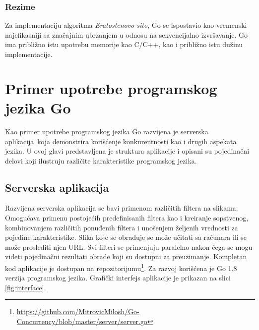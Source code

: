 \documentclass[12pt,oneside]{memoir}
\begin{document}
\subsection{Rezime}

Za implementaciju algoritma \textit{Eratostenovo sito}, Go se ispostavio kao vremenski najefikasniji sa značajnim ubrzanjem u odnosu na sekvencijalno izvršavanje. Go ima približno istu upotrebu memorije kao C/C++, kao i približno istu dužinu implementacije.


\chapter{Primer upotrebe programskog jezika Go}\label{app}

Kao primer upotrebe programskog jezika Go razvijena je serverska aplikacija\ koja demonstrira korišćenje konkurentnosti kao i drugih aspekata jezika. U ovoj glavi predstavljena je struktura aplikacije i opisani su pojedinačni delovi koji ilustruju različite karakteristike programskog jezika. 

\section{Serverska aplikacija}

Razvijena serverska aplikacija se bavi primenom različitih filtera na slikama. Omogućava primenu postojećih predefinisanih filtera kao i kreiranje sopstvenog, kombinovanjem različitih ponuđenih filtera i unošenjem željenih vrednosti za pojedine karakteristike. Slika koje se obrađuje se može učitati sa računara ili se može proslediti njen URL. Svi filteri se primenjuju paralelno nakon čega se mogu videti pojedinačni rezultati obrade koji su dostupni za preuzimanje. Kompletan kod aplikacije je dostupan na repozitorijumu\footnote{\url{https://github.com/MitrovicMilosh/Go-Concurrency/blob/master/server/server.go}}. Za razvoj korišćena je Go 1.8 verzija programskog jezika. Grafički interfejs aplikacije je prikazan na slici \ref{fig:interface}.
\end{document}
